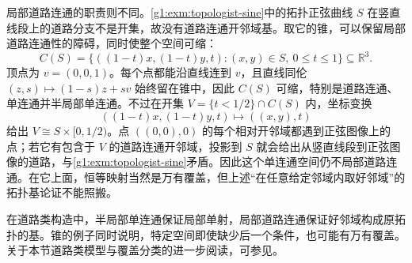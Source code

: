 局部道路连通的职责则不同。\cref{g1:exm:topologist-sine}中的拓扑正弦曲线 \(S\) 在竖直线段上的道路分支不是开集，故没有道路连通开邻域基。取它的锥，可以保留局部道路连通性的障碍，同时使整个空间可缩：
\[
	C(S)=\{((1-t)x,(1-t)y,t):(x,y)\in S,\ 0\le t\le1\}\subseteq\mathbb R^3.
\]
顶点为 \(v=(0,0,1)\)。每个点都能沿直线连到 \(v\)，且直线同伦 \((z,s)\mapsto(1-s)z+sv\) 始终留在锥中，因此 \(C(S)\) 可缩，特别是道路连通、单连通并半局部单连通。不过在开集 \(V=\{t<1/2\}\cap C(S)\) 内，坐标变换
\[
	((1-t)x,(1-t)y,t)\longmapsto((x,y),t)
\]
给出 \(V\cong S\times[0,1/2)\)。点 \(((0,0),0)\) 的每个相对开邻域都遇到正弦图像上的点；若它有包含于 \(V\) 的道路连通开邻域，投影到 \(S\) 就会给出从竖直线段到正弦图像的道路，与\cref{g1:exm:topologist-sine}矛盾。因此这个单连通空间仍不局部道路连通。在它上面，恒等映射当然是万有覆盖，但上述“在任意给定邻域内取好邻域”的拓扑基论证不能照搬。

在道路类构造中，半局部单连通保证局部单射，局部道路连通保证好邻域构成原拓扑的基。锥的例子同时说明，特定空间即使缺少后一个条件，也可能有万有覆盖。关于本节道路类模型与覆盖分类的进一步阅读，可参见\cite[第1.3节]{Hatcher2002}。
